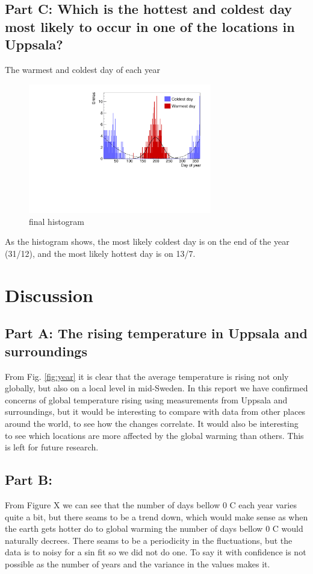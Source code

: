 \documentclass[a4paper]{article}
\begin{document}
\subsection{Part C: Which is the hottest and coldest day most likely to occur in one of the locations in Uppsala?}

\item The warmest and coldest day of each year
\begin{figure}[H]
    \centering
    \includegraphics[width=8cm]{./images/hotCold_Upp_final}
    \caption{final histogram}
    \label{fig:hist}
\end{figure}
As the histogram shows, the most likely coldest day is on the end of the year (31/12), and the most likely hottest day is on 13/7.

\section{Discussion}\label{sec:discussion}
\subsection{Part A: The rising temperature in Uppsala and surroundings}
From Fig. \ref{fig:year} it is clear that the average temperature is rising not only globally, but also on a local level in mid-Sweden. In this report we have confirmed concerns of global temperature rising using measurements from Uppsala and surroundings, but it would be interesting to compare with data from other places around the world, to see how the changes correlate. It would also be interesting to see which locations are more affected by the global warming than others. This is left for future research.

\subsection{Part B:}
From Figure X we can see that the number of days bellow 0 C each year varies quite a bit, but there seams to be a trend down, which would make sense as when the earth gets hotter do to global warming the number of days bellow 0 C would naturally decrees. There seams to be a periodicity in the fluctuations, but the data is to noisy for a sin fit so we did not do one.  To say it with confidence is not possible as the number of years and the variance in the values makes it.
\end{document}
